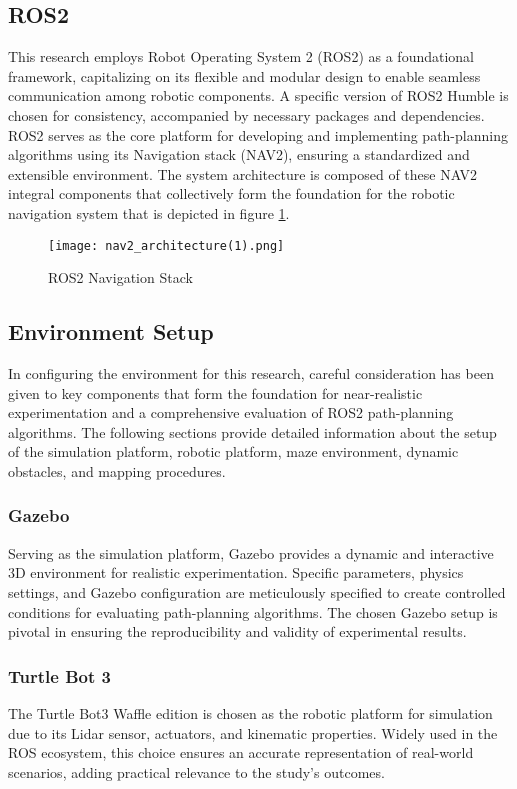 \documentclass[sigconf]{acmart}
\begin{document}
\subsection{ROS2}
This research employs Robot Operating System 2 (ROS2) as a foundational framework, capitalizing on its flexible and modular design to enable seamless communication among robotic components. A specific version of ROS2 Humble is chosen for consistency, accompanied by necessary packages and dependencies. ROS2 serves as the core platform for developing and implementing path-planning algorithms using its Navigation stack (NAV2), ensuring a standardized and extensible environment. The system architecture is composed of these NAV2 integral components that collectively form the foundation for the robotic navigation system that is depicted in figure \ref{fig:nav2}.
\begin{figure}[H]
  \centering
  \texttt{[image: nav2\_architecture(1).png]} %
  \caption{ROS2 Navigation Stack \cite{b14}}
  \label{fig:nav2}
\end{figure}
\subsection{Environment Setup}
In configuring the environment for this research, careful consideration has been given to key components that form the foundation for near-realistic experimentation and a comprehensive evaluation of ROS2 path-planning algorithms. The following sections provide detailed information about the setup of the simulation platform, robotic platform, maze environment, dynamic obstacles, and mapping procedures.
\subsubsection{Gazebo}
Serving as the simulation platform, Gazebo provides a dynamic and interactive 3D environment for realistic experimentation. Specific parameters, physics settings, and Gazebo configuration are meticulously specified to create controlled conditions for evaluating path-planning algorithms. The chosen Gazebo setup is pivotal in ensuring the reproducibility and validity of experimental results.

\subsubsection{Turtle Bot 3}
The Turtle Bot3 Waffle edition is chosen as the robotic platform for simulation due to its Lidar sensor, actuators, and kinematic properties. Widely used in the ROS ecosystem, this choice ensures an accurate representation of real-world scenarios, adding practical relevance to the study's outcomes.
\end{document}
